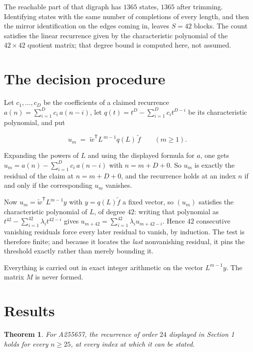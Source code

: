 \documentclass[11pt]{article}
\newtheorem{theorem}{Theorem}
\theoremstyle{definition}
\begin{document}
The reachable part of that digraph has $1365$ states, $1365$ after trimming. Identifying states with the same number of completions of every length, and then the mirror identification on the edges coming in, leaves $S = 42$ blocks. The count satisfies the linear recurrence given by the characteristic polynomial of the $42\times42$ quotient matrix; that degree bound is computed here, not assumed.

\section{The decision procedure}

Let $c_1,\dots,c_D$ be the coefficients of a claimed recurrence $a(n) = \sum_{i=1}^{D} c_i\,a(n-i)$, let $q(t) = t^{D} - \sum_{i=1}^{D} c_i t^{D-i}$ be its characteristic polynomial, and put

\[u_m \;=\; \tilde w^{\mathsf T} L^{\,m-1} q(L)\,\tilde f \qquad (m \ge 1).\]

Expanding the powers of $L$ and using the displayed formula for $a$, one gets $u_m = a(n) - \sum_{i=1}^{D} c_i\,a(n-i)$ with $n = m + D + 0$. So $u_m$ is exactly the residual of the claim at $n = m + D + 0$, and the recurrence holds at an index $n$ if and only if the corresponding $u_m$ vanishes.

Now $u_m = \tilde w^{\mathsf T} L^{m-1} y$ with $y = q(L)\tilde f$ a fixed vector, so $(u_m)$ satisfies the characteristic polynomial of $L$, of degree $42$: writing that polynomial as $t^{42} - \sum_{i=1}^{42} \lambda_i t^{42-i}$ gives $u_{m+42} = \sum_{i=1}^{42} \lambda_i u_{m+42-i}$. Hence $42$ consecutive vanishing residuals force every later residual to vanish, by induction. The test is therefore finite; and because it locates the {\itshape last} nonvanishing residual, it pins the threshold exactly rather than merely bounding it.

Everything is carried out in exact integer arithmetic on the vector $L^{m-1}y$. The matrix $M$ is never formed.

\section{Results}

\begin{theorem} For A255657, the recurrence of order $24$ displayed in Section 1 holds for every $n \ge 25$, at every index at which it can be stated.\end{theorem}
\end{document}
